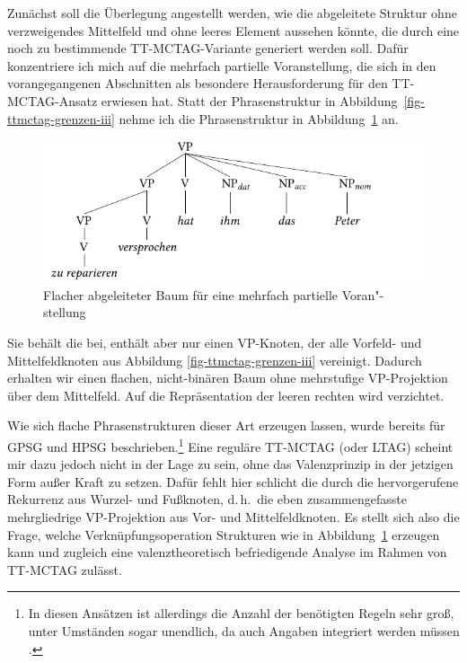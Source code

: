 \largerpage%
Zunächst soll die Überlegung angestellt werden, wie die abgeleitete Struktur ohne verzweigendes Mittelfeld und ohne leeres Element aussehen könnte, die durch eine noch zu bestimmende TT-MCTAG-Variante generiert werden soll. Dafür konzentriere ich mich auf die mehrfach partielle Voranstellung, die sich in den vorangegangenen Abschnitten als besondere Herausforderung für den TT-MCTAG-Ansatz erwiesen hat. Statt der Phrasenstruktur in Abbildung~\ref{fig-ttmctag-grenzen-iii} nehme ich die Phrasenstruktur in Abbildung~\ref{fig-ttmctag-spinal-1} an. 
\begin{figure}[t]
\centering
\includegraphics{graphics/abb745.pdf}
\caption{\label{fig-ttmctag-spinal-1}Flacher abgeleiteter Baum für eine mehrfach partielle Voran"-stellung}
\end{figure}
Sie behält die  bei, enthält aber nur einen VP-Knoten, der alle Vorfeld- und Mittelfeldknoten aus Abbildung \ref{fig-ttmctag-grenzen-iii} vereinigt. Dadurch erhalten wir einen flachen, nicht-binären Baum ohne mehrstufige VP-Projektion über dem Mittelfeld. Auf die Repräsentation der leeren rechten  wird verzichtet.
\largerpage%

Wie sich flache Phrasenstrukturen dieser Art erzeugen lassen, wurde bereits für GPSG \citep{Uszkoreit:86,Uszkoreit:87} und HPSG \citep{Pollard:96} beschrieben.\footnote{In diesen Ansätzen ist allerdings die Anzahl der benötigten Regeln sehr gro\ss, unter Umständen sogar unendlich, da auch Angaben integriert werden müssen \citep[Abschnitt~2.2.1]{Mueller:04}.} Eine reguläre TT-MCTAG (oder LTAG) scheint mir dazu jedoch nicht in der Lage zu sein, ohne das Valenzprinzip in der jetzigen Form au\ss er Kraft zu setzen. Dafür fehlt hier schlicht die durch die  hervorgerufene Rekurrenz aus Wurzel- und Fu\ss knoten, d.\,h.\ die eben zusammengefasste mehrgliedrige VP-Projektion aus Vor- und Mittelfeldknoten. Es stellt sich also die Frage, welche Verknüpfungsoperation Strukturen wie in Abbildung~\ref{fig-ttmctag-spinal-1} erzeugen kann und zugleich eine valenztheoretisch befriedigende Analyse im Rahmen von TT-MCTAG zulässt.

